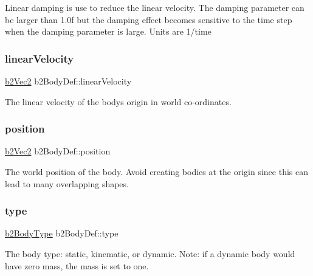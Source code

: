 Linear damping is use to reduce the linear velocity. The damping parameter can be larger than 1.\+0f but the damping effect becomes sensitive to the time step when the damping parameter is large. Units are 1/time \mbox{\label{structb2_body_def_a25fa5aa78d93159c344241af95bec2bf}} 
\subsubsection{\texorpdfstring{linearVelocity}{linearVelocity}}
{\footnotesize\ttfamily \mbox{\hyperlink{structb2_vec2}{b2\+Vec2}} b2\+Body\+Def\+::linear\+Velocity}



The linear velocity of the body\textquotesingle{}s origin in world co-\/ordinates. 

\mbox{\label{structb2_body_def_a680cadc09ad6cf4b3366cbf0914c648b}} 
\subsubsection{\texorpdfstring{position}{position}}
{\footnotesize\ttfamily \mbox{\hyperlink{structb2_vec2}{b2\+Vec2}} b2\+Body\+Def\+::position}

The world position of the body. Avoid creating bodies at the origin since this can lead to many overlapping shapes. \mbox{\label{structb2_body_def_a89cc3ad1873908042b002147b3861381}} 
\subsubsection{\texorpdfstring{type}{type}}
{\footnotesize\ttfamily \mbox{\hyperlink{b2_body_8h_a74ddb02261648c2bff691a866b5c03e0}{b2\+Body\+Type}} b2\+Body\+Def\+::type}

The body type\+: static, kinematic, or dynamic. Note\+: if a dynamic body would have zero mass, the mass is set to one. \mbox{\label{structb2_body_def_ae457dd1d39be09945eace6061121be29}} 

